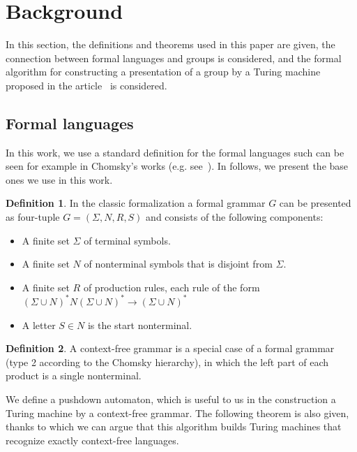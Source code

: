 \documentclass[conference]{IEEEtran}
\theoremstyle{definition}
\newtheorem{defn}{Definition}[section]
\begin{document}
\section{Background}

In this section, the definitions and theorems used in this paper are given, the connection between formal languages and groups is considered, and the formal algorithm for constructing a presentation of a group by a Turing machine proposed in the article~\cite{Sapir} is considered.

\subsection{Formal languages}

In this work, we use a standard definition for the formal languages such can be seen
for example in Chomsky's works (e.g. see~\cite{chomsky1, chomsky2}).
In follows, we present the base ones we use in this work.

\begin{defn}
In the classic formalization a formal grammar $G$ can be presented as four-tuple
$G = (\Sigma, N, R, S)$ and consists of the following components:
\begin{itemize}
    \item A finite set $\Sigma$ of terminal symbols.
    \item A finite set $N$ of nonterminal symbols that is disjoint from $\Sigma$.
    \item A finite set $R$ of production rules, each rule of the form
    $(\Sigma \cup N)^{*}N(\Sigma \cup N)^{*} \to (\Sigma \cup N)^{*}$
    \item A letter $S \in N$ is the start nonterminal.
\end{itemize}
\end{defn}

\begin{defn}
A context-free grammar is a special case of a formal grammar
(type 2 according to the Chomsky hierarchy), in which the left part of each product is a single nonterminal.
\end{defn}

We define a pushdown automaton, which is useful to us in the construction a Turing machine by a context-free grammar. The following theorem is also given, thanks to which we can argue that this algorithm builds Turing machines that recognize exactly context-free languages.
\end{document}
